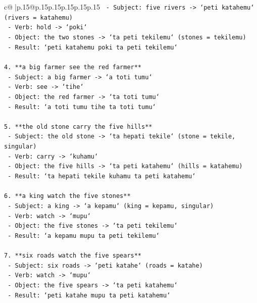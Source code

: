 \documentclass{article}
\begin{document}
{\begin{supertabular}{c@{$\;$}|p{.15\linewidth}@{}p{.15\linewidth}p{.15\linewidth}p{.15\linewidth}p{.15\linewidth}p{.15\linewidth}}
{{{\texttt{   {-} Subject: five rivers {-}> `peti katahemu` (rivers = katahemu)} \\
\texttt{   {-} Verb: hold {-}> `poki`} \\
\texttt{   {-} Object: the two stones {-}> `ta peti tekilemu` (stones = tekilemu)} \\
\texttt{   {-} Result: `peti katahemu poki ta peti tekilemu`} \\
\\ 
\texttt{4. **a big farmer see the red farmer**} \\
\texttt{   {-} Subject: a big farmer {-}> `a toti tumu`} \\
\texttt{   {-} Verb: see {-}> `tihe`} \\
\texttt{   {-} Object: the red farmer {-}> `ta toti tumu`} \\
\texttt{   {-} Result: `a toti tumu tihe ta toti tumu`} \\
\\ 
\texttt{5. **the old stone carry the five hills**} \\
\texttt{   {-} Subject: the old stone {-}> `ta hepati tekile` (stone = tekile, singular)} \\
\texttt{   {-} Verb: carry {-}> `kuhamu`} \\
\texttt{   {-} Object: the five hills {-}> `ta peti katahemu` (hills = katahemu)} \\
\texttt{   {-} Result: `ta hepati tekile kuhamu ta peti katahemu`} \\
\\ 
\texttt{6. **a king watch the five stones**} \\
\texttt{   {-} Subject: a king {-}> `a kepamu` (king = kepamu, singular)} \\
\texttt{   {-} Verb: watch {-}> `mupu`} \\
\texttt{   {-} Object: the five stones {-}> `ta peti tekilemu`} \\
\texttt{   {-} Result: `a kepamu mupu ta peti tekilemu`} \\
\\ 
\texttt{7. **six roads watch the five spears**} \\
\texttt{   {-} Subject: six roads {-}> `peti katahe` (roads = katahe)} \\
\texttt{   {-} Verb: watch {-}> `mupu`} \\
\texttt{   {-} Object: the five spears {-}> `ta peti katahemu`} \\
\texttt{   {-} Result: `peti katahe mupu ta peti katahemu`} \\
}}}
\end{supertabular}}
\end{document}
